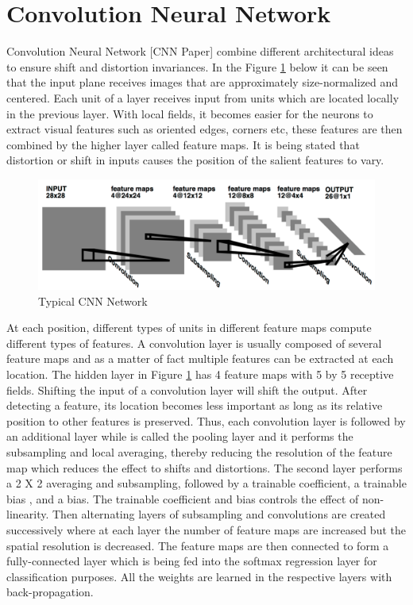\section{Convolution Neural Network} \label{sec:build5}

Convolution Neural Network [CNN Paper] combine different architectural ideas to ensure  shift and distortion invariances. In the Figure \ref{fig:Figure19} below it  can be seen that the input plane receives images that are approximately size-normalized and centered. Each unit of a layer receives input from units which are located locally in the previous layer. With local fields, it becomes easier for the neurons to extract visual features such as oriented edges, corners etc, these features are then combined by the higher layer called feature maps. It is being stated that distortion or shift in inputs causes the position of the salient features to vary. 

\begin{figure}[t]
	\begin{center}
		\includegraphics[width=\textwidth]{Figures/Figure19}
	\end{center}
	\caption{Typical CNN Network}
	\label{fig:Figure19}
\end{figure}


At each position, different types of units in different feature maps compute different types of features. A convolution layer is usually composed of several feature maps and as a matter of fact multiple features can be extracted at each location. The hidden layer in Figure \ref{fig:Figure19} has 4 feature maps with 5 by 5 receptive fields. Shifting the input of a convolution layer will shift the output. After detecting a feature, its location becomes less important as long as its relative position to other features is preserved. Thus, each convolution layer is followed by an additional layer while is called the pooling layer and it performs the subsampling and local averaging, thereby reducing the resolution of the feature map which reduces the effect to shifts and distortions. The second layer performs a 2 X 2 averaging and subsampling, followed by a trainable coefficient, a trainable bias , and a bias. The trainable coefficient and bias controls the effect of non-linearity. Then alternating layers of subsampling and convolutions are created successively where at each layer the number of feature maps are increased but the spatial resolution is decreased. The feature maps are then connected to form a fully-connected layer which is being fed into the softmax regression layer for classification purposes. All the weights are learned in the respective layers with back-propagation.

